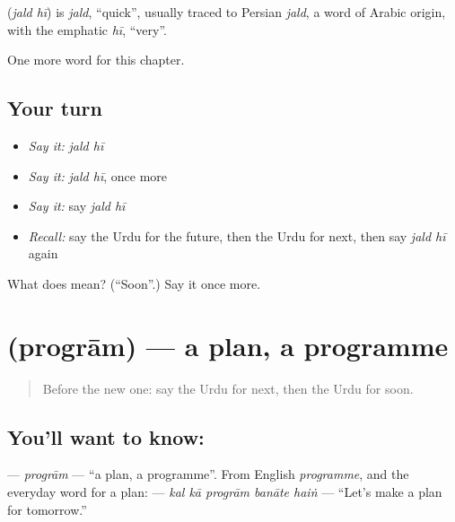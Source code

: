 \begin{cousinweb}
\textbf{ } (\emph{jald hī}) is \emph{jald}, \textquotedblleft{}quick\textquotedblright{}, usually traced to Persian \emph{jald}, a word of Arabic origin, with the emphatic \emph{hī}, \textquotedblleft{}very\textquotedblright{}.
\end{cousinweb}

\begin{grammarlens}[title={What you've built}]
One more word for this chapter.
\end{grammarlens}

\subsection*{Your turn}
\begin{itemize}
\raggedright
  \item \emph{Say it:} \emph{jald hī}
  \item \emph{Say it:} \emph{jald hī}, once more
  \item \emph{Say it:} say \emph{jald hī}
  \item \emph{Recall:} say the Urdu for the future, then the Urdu for next, then say \emph{jald hī} again
\end{itemize}

\begin{tcolorbox}[breakable,colback=teal!4,colframe=teal!35!black,title={Before you move on}]
What does   mean? (\textquotedblleft{}Soon\textquotedblright{}.) Say it once more.
\end{tcolorbox}
\section[\texorpdfstring{\ur{پروگرام} (progrām)}{پروگرام (progrām)}]{ (progrām) — a plan, a programme}

\label{lesson:UR-C145-program}



\begin{quote}
Before the new one: say the Urdu for next, then the Urdu for soon.
\end{quote}

\subsection*{You'll want to know: }
\textbf{} — \emph{progrām} — \textquotedblleft{}a plan, a programme\textquotedblright{}. From English \emph{programme}, and the everyday word for a plan: \textbf{    } — \emph{kal kā progrām banāte haiṅ} — \textquotedblleft{}Let's make a plan for tomorrow.\textquotedblright{}

